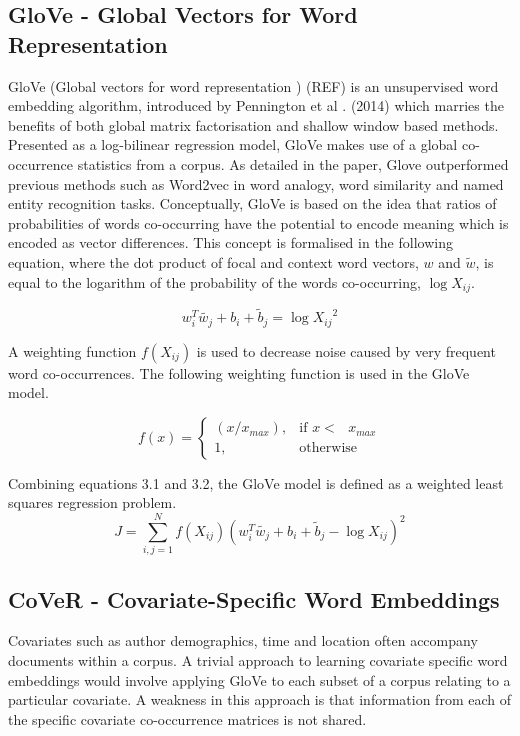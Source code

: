 \subsection{GloVe - Global Vectors for Word Representation}
GloVe (Global vectors for word representation ) (REF) is an unsupervised word embedding algorithm, introduced by Pennington et al . (2014) which marries the benefits of both global matrix factorisation and shallow window based methods. Presented as a log-bilinear regression model, GloVe makes use of a global co-occurrence statistics from a corpus. As detailed in the paper, Glove outperformed previous methods such as Word2vec in word analogy, word similarity and named entity recognition tasks. Conceptually, GloVe is based on the idea that ratios of probabilities of words co-occurring have the potential to encode meaning which is encoded as vector differences. This concept is formalised in the following equation, where the dot product of focal and context word vectors, \(w\) and \(\tilde{w}\), is equal to the logarithm of the probability of the words co-occurring, \(\log{X_{ij}}\).

\begin{equation}
w_{i}^{T} \tilde{w_{j}} + b_{i} + \tilde{b}_{j} = \log{X_{ij}}^{2}
\end{equation}

\noindent
\newline
A weighting function \(f(X_{ij})\) is used to decrease noise caused by very frequent word co-occurrences. The following weighting function is used in the GloVe model.

\begin{equation}
	f(x) =
	\begin{cases}
	(x/x_{max}), & \text{if  \(x <\) } x_{max} \\
	1, & \text{otherwise}
	\end{cases}
\end{equation}

\noindent
\newline
Combining equations 3.1 and 3.2, the GloVe model is defined as a weighted least squares regression problem.
\begin{equation}
	J = \sum_{i, j=1}^{N} f(X_{ij}) (w_{i}^{T} \tilde{w_{j}} + b_{i} + \tilde{b}_{j} - \log{X_{ij}})^{2}
\end{equation}
\subsection{CoVeR - Covariate-Specific Word Embeddings}
Covariates such as author demographics, time and location often accompany documents within a corpus. A trivial approach to learning covariate specific word embeddings would involve applying GloVe to each subset of a corpus relating to a particular covariate. A weakness in this approach is that information from each of the specific covariate co-occurrence matrices is not shared.

